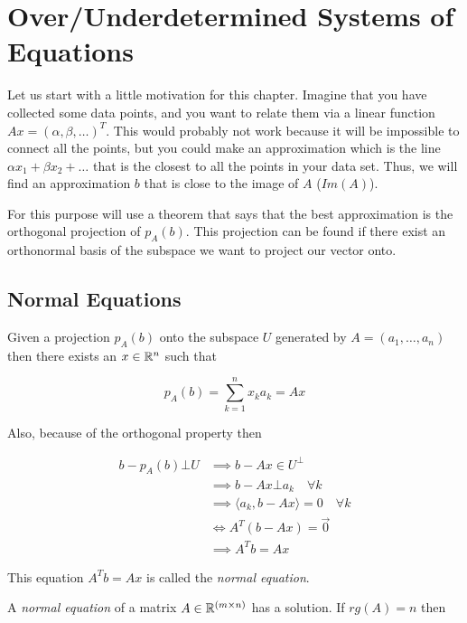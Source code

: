 \newpage
\section{Over/Underdetermined Systems of Equations}

Let us start with a little motivation for this chapter. Imagine that you have collected some data points, 
and you want to relate them via a linear function \(Ax = (\alpha, \beta, \dots)^T\). This would probably 
not work because it will be impossible to connect all the points, but you could make an approximation 
which is the line \(\alpha x_1 + \beta x_2 + \dots\) that is the closest to all the points in your data 
set. Thus, we will find an approximation 
\(b\) that is close to the image of \(A\) (\(Im(A)\)).
\vspace{\baselineskip}

For this purpose will use a theorem that says that the best approximation is the orthogonal projection of 
\(p_A (b)\). This projection can be found if there exist an orthonormal basis of the subspace we want to 
project our vector onto.

\subsection{Normal Equations}

Given a projection \(p_A (b)\) onto the subspace \(U\) generated by \(A = (a_1, \dots, a_n)\) then there 
exists an \(x \in \mathbb{R}^n\) such that 

\[
	p_{A}(b) = \sum_{k = 1}^{n} x_k a_k = Ax
\]

Also, because of the orthogonal property then

\begin{align*}
	b - p_{A}(b) \bot U &\implies b - Ax  \in U^{\bot}\\
						&\implies b - Ax \bot a_k \quad \forall k\\
						&\implies \langle a_k, b - Ax \rangle = 0 \quad \forall k\\
						&\iff A^{T} (b - Ax) = \vec{0}\\
						&\implies A^{T}b = Ax 
\end{align*}

This equation \(A^{T}b = Ax\) is called the \emph{normal equation}.
\vspace{\baselineskip}

A \emph{normal equation} of a matrix \(A \in \mathbb{R}^{(m \times n)}\) has a solution. 
If \(rg(A) = n\) then 

